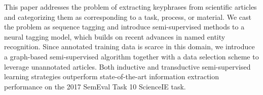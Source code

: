 This paper addresses the problem of extracting keyphrases from scientific articles and categorizing them as corresponding to a task, process, or material. We cast the problem as sequence tagging and introduce semi-supervised methods to a neural tagging model, which builds on recent advances in named entity recognition. Since annotated training data is scarce in this domain, we introduce a graph-based semi-supervised algorithm together with a data selection scheme to leverage unannotated articles. Both inductive and transductive semi-supervised learning strategies outperform state-of-the-art information extraction performance on the 2017 SemEval Task 10 ScienceIE task.
